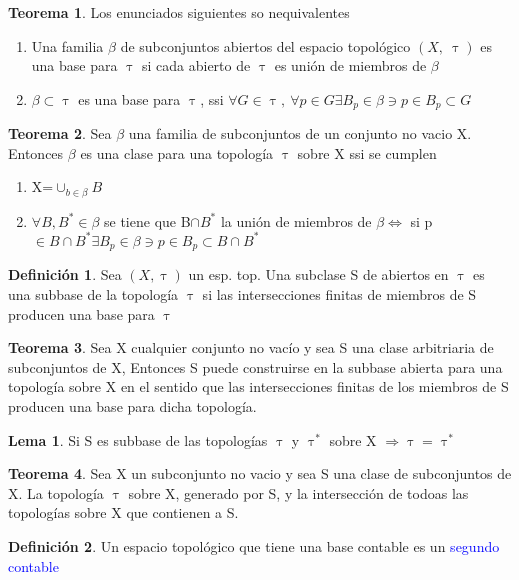 \documentclass{article}
\theoremstyle{definition}
\newtheorem{definition}{Definición}[section]
\newtheorem{theorem}{Teorema}[section]
\newtheorem{lemma}{Lema}[section]
\begin{document}
\begin{theorem}
	Los enunciados siguientes so nequivalentes
	\begin{enumerate}
		\item Una familia $\beta$ de subconjuntos abiertos del espacio topológico $(X,\ \uptau)$ es una base para $\uptau$ si cada abierto de $\uptau$ es unión de miembros de $\beta$
		\item $\beta\subset\uptau$ es una base para $\uptau$, ssi $\forall G\in \uptau,\ \forall p\in G \exists B_p\in\beta\ni p\in B_p\subset G$ 
	\end{enumerate}
\end{theorem}
\begin{theorem}
	 Sea $\beta$ una familia de subconjuntos de un conjunto no vacio X. Entonces $\beta$ es una clase para una topología $\uptau$ sobre X ssi se cumplen 
	 \begin{enumerate}
	 \item X=$\cup_{b\in\beta} B$
	 \item $\forall B, B^*\in\beta$ se tiene que B$\cap B^*$ la unión de miembros de $\beta \Leftrightarrow$ si p$\in B\cap B^*\exists B_p\in\beta\ni p\in B_p\subset B\cap B^*$ 
	 \end{enumerate}
\end{theorem}
\begin{definition}
	Sea $(X,\uptau)$ un esp. top. Una subclase S de abiertos en $\uptau$ es una subbase de la topología $\uptau$ si las intersecciones finitas de miembros de S producen una base para $\uptau$
\end{definition}
\begin{theorem}
	Sea X cualquier conjunto no vacío y sea S una clase arbitriaria de subconjuntos de X, Entonces S puede construirse en la subbase abierta para una topología sobre X en el sentido que las intersecciones finitas de los miembros de S producen una base para dicha topología.
\end{theorem}
\begin{lemma}
Si S es subbase de las topologías $\uptau$ y $\uptau^*$  sobre X $\Rightarrow\uptau = \uptau^*$
\end{lemma}
\begin{theorem}
Sea X un subconjunto no vacio y sea S una clase de subconjuntos de X. La topología $\uptau$ sobre X, generado por S, y la intersección de todoas las topologías sobre X que contienen a S. 
\end{theorem}
\begin{definition}
	Un espacio topológico que tiene una base contable es un \textcolor{blue}{segundo contable}
\end{definition}
\end{document}
